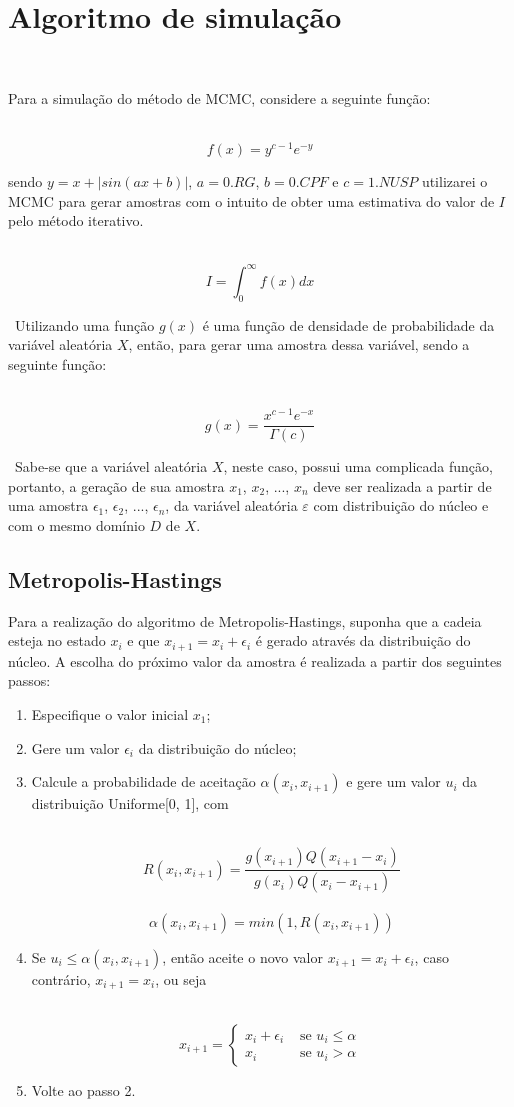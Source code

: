 \documentclass{article} %
\begin{document}
\section{Algoritmo de simulação}

\ 

\qquad Para a simulação do método de MCMC, considere a seguinte função:

\ $$f(x) = y^{c-1}e^{-y}$$ 

\noindent sendo $y = x + |sin(ax+b)|$, $a = 0.RG$, $b = 0.CPF$ e $c = 1.NUSP$ utilizarei o MCMC para gerar amostras com o intuito de obter uma estimativa do valor de $I$ pelo método iterativo.

\ $$I = \int_{0}^{\infty}f(x) dx $$

\ Utilizando uma função $g(x)$ é uma função de densidade de probabilidade da variável aleatória $X$, então, para gerar uma amostra dessa variável, sendo a seguinte função:

\ $$g(x) = \frac{x^{c-1}e^{-x}}{\Gamma(c)}$$

\ Sabe-se que a variável aleatória $X$, neste caso, possui uma complicada função,  portanto, a geração de sua amostra $x_{1}$, $x_{2}$, ..., $x_{n}$ deve ser realizada a partir de uma amostra $\epsilon_{1}$, $\epsilon_{2}$, ..., $\epsilon_{n}$, da variável aleatória $\varepsilon$ com distribuição do núcleo e com o mesmo domínio $D$ de $X$. 

\subsection{Metropolis-Hastings}

\qquad Para a realização do algoritmo de Metropolis-Hastings, suponha que a  cadeia esteja no estado $x_{i}$ e que $x_{i + 1} = x_{i} + \epsilon_{i}$ é gerado através da distribuição do núcleo. A escolha do próximo valor da amostra é realizada a partir dos seguintes passos:

\begin{enumerate}
\item Especifique o valor inicial $x_{1}$;
\item Gere um valor $\epsilon_{i}$ da distribuição do núcleo;
\item Calcule a probabilidade de aceitação $\alpha(x_{i}, x_{i + 1})$ e gere um valor $u_{i}$ da distribuição Uniforme[0, 1], com

\ $$R(x_{i}, x_{i + 1}) = \frac{g(x_{i + 1})Q(x_{i + 1} - x_{i})}{g(x_{i})Q(x_{i} - x_{i + 1})}$$
\ $$\alpha(x_{i}, x_{i + 1}) = min(1 , R(x_{i}, x_{i + 1}))$$

\item Se $u_{i} \leq \alpha(x_{i}, x_{i + 1})$, então aceite o novo valor $x_{i + 1} = x_{i} + \epsilon_{i}$, caso contrário, $x_{i + 1} = x_{i}$, ou seja

\ $$x_{i + 1} = \left\{ \begin{array}{ll}
x_{i} + \epsilon_{i} & \mbox{ se } u_{i} \leq \alpha \\
x_{i} & \mbox{ se } u_{i} > \alpha \end{array} \right.\ $$

\item Volte ao passo 2.
\end{enumerate}
\end{document}
